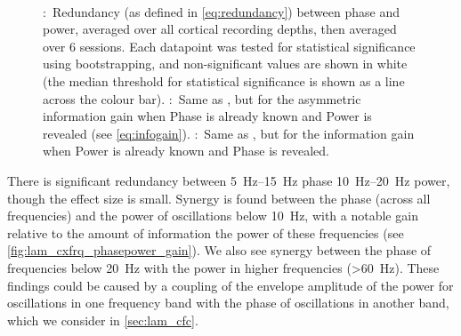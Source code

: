 \begin{figure}[htbp]
    \centering
    \\
    \hspace*{\fill}
    \hspace*{\fill}\hspace{.2cm}\hspace*{\fill}
    \hspace*{\fill}
    \caption{
\protect{}:~Redundancy (as defined in \autoref{eq:redundancy}) between phase and power, averaged over all cortical recording depths, then averaged over \num{6} sessions.
Each datapoint was tested for statistical significance using bootstrapping, and non-significant values are shown in white (the median threshold for statistical significance is shown as a line across the colour bar).
\protect{}:~Same as \protect{}, but for the asymmetric information gain when Phase is already known and Power is revealed (see \autoref{eq:infogain}).
\protect{}:~Same as \protect{}, but for the information gain when Power is already known and Phase is revealed.
}
\label{fig:lam_cxfrq_powerphase_info}
\end{figure}

There is significant redundancy between \SIrange{5}{15}{Hz} phase \SIrange{10}{20}{Hz} power, though the effect size is small.
Synergy is found between the phase (across all frequencies) and the power of oscillations below \SI{10}{Hz}, with a notable gain relative to the amount of information the power of these frequencies (see \autoref{fig:lam_cxfrq_phasepower_gain}).
We also see synergy between the phase of frequencies below \SI{20}{Hz} with the power in higher frequencies (\SI{>60}{Hz}).
These findings could be caused by a coupling of the envelope amplitude of the power for oscillations in one frequency band with the phase of oscillations in another band, which we consider in \autoref{sec:lam_cfc}.

